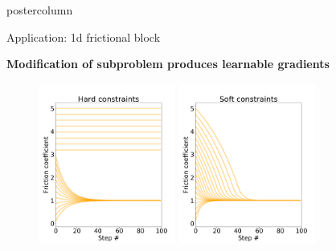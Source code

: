 \documentclass[final,hyperref={pdfpagelabels=false},5pt]{beamer}
\begin{document}
\begin{frame}
\begin{columns}
\begin{column}{.49\textwidth}
\begin{beamercolorbox}[center,wd=\textwidth]{postercolumn}
\begin{minipage}[T]{.95\textwidth}
{\begin{block}{Application: 1d frictional block}
              \vspace{1ex}
             \begin{center}
             	\textbf{Modification of subproblem produces learnable gradients}
             \end{center}
              \begin{figure}
              	\includegraphics[width=0.4\textwidth]{hard_constraints}
              	\hspace{0.125\textwidth}
              	\includegraphics[width=0.4\textwidth]{soft_constraints}
              \end{figure}
            \end{block}
            
}
\end{minipage}
\end{beamercolorbox}
\end{column}
\end{columns}
\end{frame}
\end{document}
